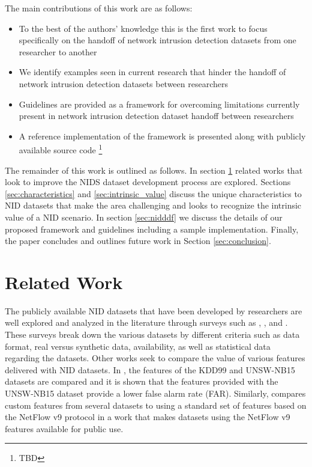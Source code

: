 \documentclass[conference]{IEEEtran}
\begin{document}
The main contributions of this work are as follows:

\begin{itemize}
    \item To the best of the authors' knowledge this is the first work to focus specifically on the handoff of network intrusion detection datasets from one researcher to another
    \item We identify examples seen in current research that hinder the handoff of network intrusion detection datasets between researchers
    \item Guidelines are provided as a framework for overcoming limitations currently present in network intrusion detection dataset handoff between researchers
    \item A reference implementation of the framework is presented along with publicly available source code \footnote{TBD}
\end{itemize}

The remainder of this work is outlined as follows.
In section \ref{sec:related_work} related works that look to improve the NIDS dataset development process are explored.
Sections \ref{sec:characteristics} and \ref{sec:intrinsic_value} discuss the unique characteristics to NID datasets that make the area challenging and looks to recognize the intrinsic value of a NID scenario.
In section \ref{sec:nidddf} we discuss the details of our proposed framework and guidelines including a sample implementation.
Finally, the paper concludes and outlines future work in Section \ref{sec:conclusion}.

\section{Related Work}\label{sec:related_work}

The publicly available NID datasets that have been developed by researchers are well explored and analyzed in the literature through surveys such as \cite{ring2019survey}, \cite{Chou2022}, and \cite{yang2022systematic}.
These surveys break down the various datasets by different criteria such as data format, real versus synthetic data, availability, as well as statistical data regarding the datasets.
Other works seek to compare the value of various features delivered with NID datasets.
In \cite{7809531}, the features of the KDD99 \cite{kdd99} and UNSW-NB15 \cite{unswnb15} datasets are compared and it is shown that the features provided with the UNSW-NB15 dataset provide a lower false alarm rate (FAR).
Similarly, \cite{sarhan2020netflow} compares custom features from several datasets to using a standard set of features based on the NetFlow v9 protocol \cite{netflowv9format} in a work that makes datasets using the NetFlow v9 features available for public use.
\end{document}
